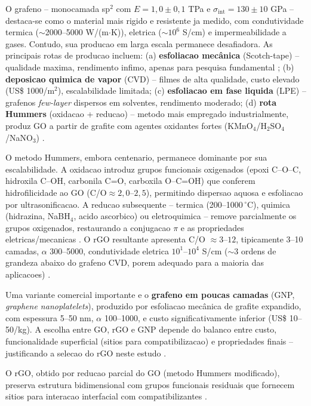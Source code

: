 \documentclass[11pt,a4paper,oneside]{article}
\begin{document}
O grafeno -- monocamada sp$^2$ com $E{=}1{,}0{\pm}0{,}1$ TPa e $\sigma_{\text{int}}{=}130{\pm}10$ GPa \cite{Lee2008} -- destaca-se como o material mais rigido e resistente ja medido, com condutividade termica (${\sim}$2000--5000 W/(m$\cdot$K)), eletrica (${\sim}10^6$ S/cm) e impermeabilidade a gases. Contudo, sua producao em larga escala permanece desafiadora. As principais rotas de producao incluem: (a) {\bfseries esfoliacao mecânica} (Scotch-tape) -- qualidade maxima, rendimento infimo, apenas para pesquisa fundamental \cite{Geim2007}; (b) {\bfseries deposicao quimica de vapor} (CVD) -- filmes de alta qualidade, custo elevado (US\$ 1000/m$^2$), escalabilidade limitada; (c) {\bfseries esfoliacao em fase liquida} (LPE) -- grafenos \textit{few-layer} dispersos em solventes, rendimento moderado; (d) {\bfseries rota Hummers} (oxidacao + reducao) -- metodo mais empregado industrialmente, produz GO a partir de grafite com agentes oxidantes fortes (KMnO$_4$/H$_2$SO$_4$/NaNO$_3$) \cite{Hummers1958}.

O metodo Hummers, embora centenario, permanece dominante por sua escalabilidade. A oxidacao introduz grupos funcionais oxigenados (epoxi C--O--C, hidroxila C--OH, carbonila C=O, carboxila O--C=OH) que conferem hidrofilicidade ao GO (C/O${\approx}2{,}0$--$2{,}5$), permitindo dispersao aquosa e esfoliacao por ultrasonificacao. A reducao subsequente -- termica (200--1000$\,^{\circ}$C), quimica (hidrazina, NaBH$_4$, acido ascorbico) ou eletroquimica -- remove parcialmente os grupos oxigenados, restaurando a conjugacao $\pi$ e as propriedades eletricas/mecanicas \cite{Faria2017}. O rGO resultante apresenta C/O ${\approx}3$--$12$, tipicamente 3--10 camadas, $\alpha$ 300--5000, condutividade eletrica $10^1$--$10^4$ S/cm ($\sim$3 ordens de grandeza abaixo do grafeno CVD, porem adequado para a maioria das aplicacoes) \cite{Papageorgiou2017, Mohan2018}.

Uma variante comercial importante e o {\bfseries grafeno em poucas camadas} (GNP, \textit{graphene nanoplatelets}), produzido por esfoliacao mecânica de grafite expandido, com espessura 5--50 nm, $\alpha$ 100--1000, e custo significativamente inferior (US\$ 10--50/kg). A escolha entre GO, rGO e GNP depende do balanco entre custo, funcionalidade superficial (sitios para compatibilizacao) e propriedades finais -- justificando a selecao do rGO neste estudo \cite{Araby2020}.

O rGO, obtido por reducao parcial do GO (metodo Hummers modificado), preserva estrutura bidimensional com grupos funcionais residuais que fornecem sitios para interacao interfacial com compatibilizantes \cite{Faria2017, Yun2011}.
\end{document}
